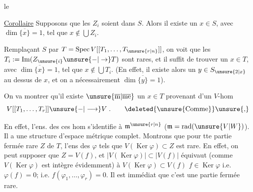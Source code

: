 
le

\uline{Corollaire} Supposons que les $Z_i$ soient \uline{} dans $S$. Alors il existe un $x\in S$, avec $\dim\overline{\{x\}}=1$, tel que $x\notin\bigcup Z_i$.

Remplaçant $S$ par $T=\operatorname{Spec} V[[T_1,\ldots,T_{\unsure{r|n}}]]$,  on voit que les $T_i:=\operatorname{Im}(Z_{\unsure{i}}\unsure{-|\to}T)$ sont rares, et il suffit de trouver un $x\in T$, avec $\dim\overline{\{x\}}=1$, tel que $x\notin\bigcup T_i$. (En effet, il existe alors un $y\in S_{\unsure{2|x}}$ au dessus de $x$, et on a nécessairement $\dim\overline{\{y\}}=1$).

On va montrer qu'il existe $\unsure{\overline{\mathrm{m}}|\overline{\mathrm{me}}}$ un $x\in T$ provenant d'un $V$-hom
\[
V[[T_1,\ldots,T_r]]\unsure{-|\longrightarrow}V\;.\qquad \deleted{\text{\unsure{Comme}}}\unsure{\text{,}}
\]

En effet, l'ens. des ces hom s'identifie à $\mathfrak m^{\unsure{r|n}}$ ($\mathfrak m=\operatorname{rad}(\unsure{V|W})$). Il a une structure d'espace métrique complet. Montrons que pour tte partie fermée rare $Z$ de $T$, l'ens des $\varphi$ tels que $V(\operatorname{Ker}\varphi)\subset Z$ est rare. En effet, on peut supposer que  $Z=V(f)$,  et $\lvert V(\operatorname{Ker}\varphi)\rvert\subset\lvert V(f)\rvert$ équivaut (comme $V(\operatorname{Ker}\varphi)$ est intègre  évidemment) à $V(\operatorname{Ker}\varphi)\subset V(f)$  $f\in\operatorname{Ker}\varphi$ i.e. $\varphi(f)=0$; i.e. $f(\varphi_1,\ldots,\varphi_r)=0$. Il est immédiat que c'est une partie fermée rare.
